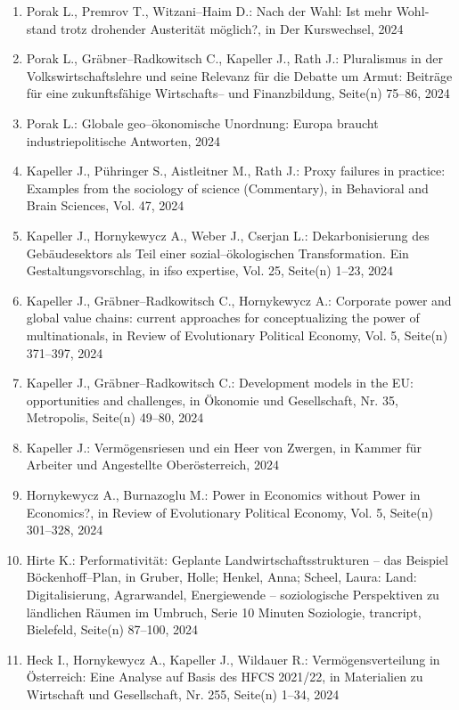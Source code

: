 \begin{enumerate}
	 \item Porak L., Premrov T., Witzani--Haim D.: Nach der Wahl: Ist mehr Wohl­stand trotz dro­hen­der Aus­teri­tät möglich?, in Der Kurswechsel, 2024
	 \item Porak L., Gräbner--Radkowitsch C., Kapeller J., Rath J.: Pluralismus in der Volkswirtschaftslehre und seine Relevanz für die Debatte um Armut: Beiträge für eine zukunftsfähige Wirtschafts-- und Finanzbildung, Seite(n) 75--86, 2024
	 \item Porak L.: Globale geo--ökonomische Unordnung: Europa braucht industriepolitische Antworten, 2024
	 \item Kapeller J., Pühringer S., Aistleitner M., Rath J.: Proxy failures in practice: Examples from the sociology of science (Commentary), in Behavioral and Brain Sciences, Vol. 47, 2024
	 \item Kapeller J., Hornykewycz A., Weber J., Cserjan L.: Dekarbonisierung des Gebäudesektors als Teil einer sozial--ökologischen Transformation. Ein Gestaltungsvorschlag, in ifso expertise, Vol. 25, Seite(n) 1--23, 2024
	 \item Kapeller J., Gräbner--Radkowitsch C., Hornykewycz A.: Corporate power and global value chains: current approaches for conceptualizing the power of multinationals, in Review of Evolutionary Political Economy, Vol. 5, Seite(n) 371--397, 2024
	 \item Kapeller J., Gräbner--Radkowitsch C.: Development models in the EU:  opportunities and challenges, in Ökonomie und Gesellschaft, Nr. 35, Metropolis, Seite(n) 49--80, 2024
	 \item Kapeller J.: Vermögensriesen und ein Heer von Zwergen, in Kammer für Arbeiter und Angestellte Oberösterreich, 2024
	 \item Hornykewycz A., Burnazoglu M.: Power in Economics without Power in Economics?, in Review of Evolutionary Political Economy, Vol. 5, Seite(n) 301--328, 2024
	 \item Hirte K.: Performativität: Geplante Landwirtschaftsstrukturen – das Beispiel Böckenhoff--Plan, in Gruber, Holle; Henkel, Anna; Scheel, Laura: Land: Digitalisierung, Agrarwandel, Energiewende – soziologische Perspektiven zu ländlichen Räumen im Umbruch, Serie 10 Minuten Soziologie, trancript, Bielefeld, Seite(n) 87--100, 2024
	 \item Heck I., Hornykewycz A., Kapeller J., Wildauer R.: Vermögensverteilung  in Österreich: Eine Analyse auf Basis des HFCS 2021/22, in Materialien zu Wirtschaft und Gesellschaft, Nr. 255, Seite(n) 1--34, 2024

\end{enumerate}
